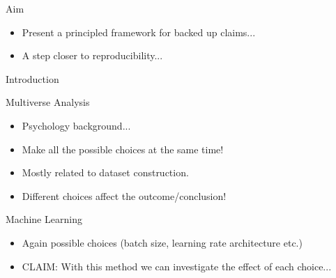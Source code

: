 \documentclass[aspectratio=169]{beamer}
\begin{document}
\begin{frame}{Aim}
  \centering
  \begin{itemize}
    \item Present a principled framework for backed up claims...
    \item A step closer to reproducibility...
  \end{itemize}
\end{frame}

\begin{frame}{Introduction}
  \begin{minipage}{0.5\textwidth}
    {
      \color{Pink} Multiverse Analysis \cite{steegen2016}
      \begin{itemize}
        \item Psychology background...
        \item Make all the possible choices at the same time!
        \item Mostly related to dataset construction.
        \item Different choices affect the outcome/conclusion!
      \end{itemize}
    }
  \end{minipage}%
  \begin{minipage}{0.5\textwidth}
    {
      \color{Pink} Machine Learning
      \begin{itemize}
        \item Again possible choices (batch size, learning rate architecture etc.) 
        \item CLAIM: With this method we can investigate the effect of each choice...
      \end{itemize}
    }
  \end{minipage}
\end{frame}
\end{document}
